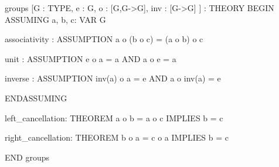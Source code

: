 groups [G : TYPE,
        e : G,
        o : [G,G->G],
        inv : [G->G] ] : THEORY
  BEGIN
    ASSUMING
      a, b, c: VAR G
 
      associativity : ASSUMPTION  a o (b o c) = (a o b) o c

      unit : ASSUMPTION  e o a = a AND a o e = a

      inverse : ASSUMPTION inv(a) o a = e AND a o inv(a) = e

    ENDASSUMING

    left_cancellation: THEOREM a o b = a o c IMPLIES b = c

    right_cancellation: THEOREM b o a = c o a IMPLIES b = c
 
  END groups
